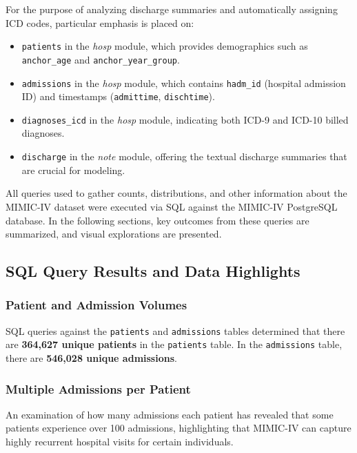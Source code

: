 \vspace{5pt}
\noindent
For the purpose of analyzing discharge summaries and automatically assigning ICD codes, particular emphasis is placed on:
\begin{itemize}
    \item \texttt{patients} in the \textit{hosp} module, which provides demographics such as \texttt{anchor\_age} and \texttt{anchor\_year\_group}.
    \item \texttt{admissions} in the \textit{hosp} module, which contains \texttt{hadm\_id} (hospital admission ID) and timestamps (\texttt{admittime}, \texttt{dischtime}).
    \item \texttt{diagnoses\_icd} in the \textit{hosp} module, indicating both ICD-9 and ICD-10 billed diagnoses.
    \item \texttt{discharge} in the \textit{note} module, offering the textual discharge summaries that are crucial for modeling.
\end{itemize}

\vspace{5pt}
\noindent
All queries used to gather counts, distributions, and other information about the MIMIC-IV dataset were executed via SQL against the MIMIC-IV PostgreSQL database. In the following sections, key outcomes from these queries are summarized, and visual explorations are presented.

\subsection{SQL Query Results and Data Highlights}\label{sec:p1:sql_results}

\subsubsection{Patient and Admission Volumes}
\noindent
SQL queries against the \texttt{patients} and \texttt{admissions} tables determined that there are \textbf{364,627 unique patients} in the \texttt{patients} table. In the \texttt{admissions} table, there are \textbf{546,028 unique admissions}. 

\subsubsection{Multiple Admissions per Patient}
\noindent
An examination of how many admissions each patient has revealed that some patients experience over 100 admissions, highlighting that MIMIC-IV can capture highly recurrent hospital visits for certain individuals.

